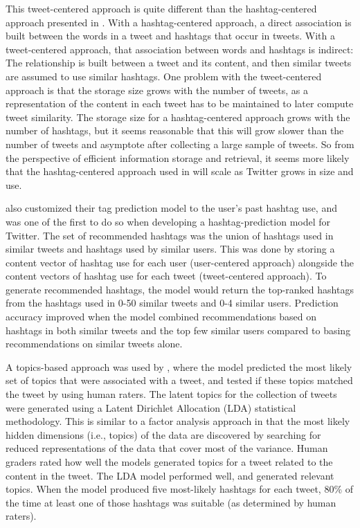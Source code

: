 \documentclass[man,floatsintext,donotrepeattitle]{apa6}
\begin{document}
This tweet-centered approach is quite different than the hashtag-centered approach presented in \textcite{Mazzia2009}.
With a hashtag-centered approach, a direct association is built between the words in a tweet and hashtags that occur in tweets.
With a tweet-centered approach, that association between words and hashtags is indirect:
The relationship is built between a tweet and its content, and then similar tweets are assumed to use similar hashtags.
One problem with the tweet-centered approach is that the storage size grows with the number of tweets, as a representation of the content in each tweet has to be maintained to later compute tweet similarity.
The storage size for a hashtag-centered approach grows with the number of hashtags, but it seems reasonable that this will grow slower than the number of tweets and asymptote after collecting a large sample of tweets.
So from the perspective of efficient information storage and retrieval, it seems more likely that the hashtag-centered approach used in \textcite{Mazzia2009} will scale as Twitter grows in size and use.

\textcite{Kywe2012} also customized their tag prediction model to the user's past hashtag use, and was one of the first to do so when developing a hashtag-prediction model for Twitter.
The set of recommended hashtags was the union of hashtags used in similar tweets and hashtags used by similar users.
This was done by storing a content vector of hashtag use for each user (user-centered approach) alongside the content vectors of hashtag use for each tweet (tweet-centered approach).
To generate recommended hashtags, the model would return the top-ranked hashtags from the hashtags used in 0-50 similar tweets and 0-4 similar users.
Prediction accuracy improved when the model combined recommendations based on hashtags in both similar tweets and the top few similar users compared to basing recommendations on similar tweets alone. 

A topics-based approach was used by \textcite{Godin2013}, where the model predicted the most likely set of topics that were associated with a tweet, and tested if these topics matched the tweet by using human raters.
The latent topics for the collection of tweets were generated using a Latent Dirichlet Allocation (LDA) statistical methodology.
This is similar to a factor analysis approach in that the most likely hidden dimensions (i.e., topics) of the data are discovered by searching for reduced representations of the data that cover most of the variance. 
Human graders rated how well the models generated topics for a tweet related to the content in the tweet.
The LDA model performed well, and generated relevant topics.
When the model produced five most-likely hashtags for each tweet, 80\% of the time at least one of those hashtags was suitable (as determined by human raters).
\end{document}
